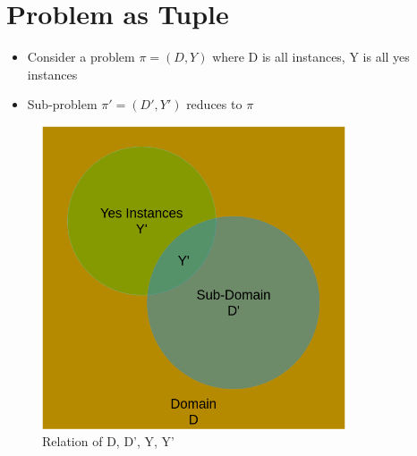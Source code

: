 \documentclass[12pt, letter]{article}
\begin{document}
\section{Problem as Tuple}%
\label{sec:problem_as_tuple}
\begin{itemize}
	\item Consider a problem $\pi = (D,Y)$ where D is all instances, Y is all yes instances
	\item Sub-problem $\pi' = (D',Y')$ reduces to $\pi$
\end{itemize}
\begin{figure}[h]
	\centering
	\includegraphics[width=0.8\textwidth]{imgs/domain}
	\caption{Relation of D, D', Y, Y'}
	\label{fig:domain}
\end{figure}
\end{document}
